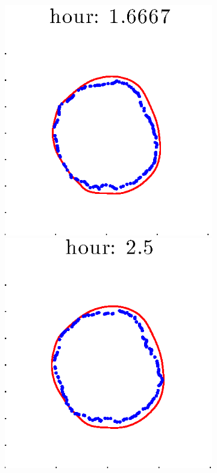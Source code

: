 \documentclass[12pt]{article}
\begin{document}
\begin{figure}[h!]
\begin{subfigure}[b]{.3\textwidth}
		\includegraphics[height=.15\textheight]{Pos0/firsthalf/full3.eps}
		\includegraphics[height=.15\textheight]{Pos0/firsthalf/full4.eps}

\end{subfigure}
\end{figure}
\end{document}
